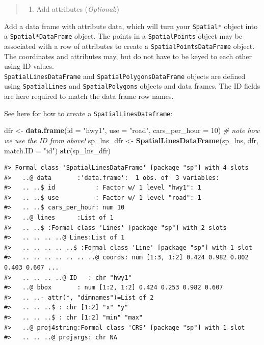 \documentclass[]{book}
\newenvironment{Shaded}{\begin{snugshade}}{\end{snugshade}}
\newcommand{\KeywordTok}[1]{\textcolor[rgb]{0.13,0.29,0.53}{\textbf{#1}}}
\newcommand{\DataTypeTok}[1]{\textcolor[rgb]{0.13,0.29,0.53}{#1}}
\newcommand{\DecValTok}[1]{\textcolor[rgb]{0.00,0.00,0.81}{#1}}
\newcommand{\StringTok}[1]{\textcolor[rgb]{0.31,0.60,0.02}{#1}}
\newcommand{\CommentTok}[1]{\textcolor[rgb]{0.56,0.35,0.01}{\textit{#1}}}
\newcommand{\NormalTok}[1]{#1}
\providecommand{\tightlist}{%
  \setlength{\itemsep}{0pt}\setlength{\parskip}{0pt}}
\theoremstyle{definition}
\theoremstyle{definition}
\theoremstyle{definition}
\theoremstyle{remark}
\begin{document}
\begin{quote}
\begin{enumerate}
\def\labelenumi{\Roman{enumi}.}
\setcounter{enumi}{2}
\tightlist
\item
  Add attributes (\emph{Optional}:)
\end{enumerate}
\end{quote}

Add a data frame with attribute data, which will turn your
\texttt{Spatial*} object into a \texttt{Spatial*DataFrame} object. The
points in a \texttt{SpatialPoints} object may be associated with a row
of attributes to create a \texttt{SpatialPointsDataFrame} object. The
coordinates and attributes may, but do not have to be keyed to each
other using ID values.\\
\texttt{SpatialLinesDataFrame} and \texttt{SpatialPolygonsDataFrame}
objects are defined using \texttt{SpatialLines} and
\texttt{SpatialPolygons} objects and data frames. The ID fields are here
required to match the data frame row names.

See here for how to create a \texttt{SpatialLinesDataframe}:

\begin{Shaded}
\begin{Highlighting}[]
\NormalTok{dfr <-}\StringTok{ }\KeywordTok{data.frame}\NormalTok{(}\DataTypeTok{id =} \StringTok{"hwy1"}\NormalTok{, }\DataTypeTok{use =} \StringTok{"road"}\NormalTok{, }\DataTypeTok{cars_per_hour =} \DecValTok{10}\NormalTok{) }\CommentTok{# note how we use the ID from above!}
\NormalTok{sp_lns_dfr <-}\StringTok{ }\KeywordTok{SpatialLinesDataFrame}\NormalTok{(sp_lns, dfr, }\DataTypeTok{match.ID =} \StringTok{"id"}\NormalTok{)}
\KeywordTok{str}\NormalTok{(sp_lns_dfr)}
\end{Highlighting}
\end{Shaded}

\begin{verbatim}
#> Formal class 'SpatialLinesDataFrame' [package "sp"] with 4 slots
#>   ..@ data       :'data.frame':  1 obs. of  3 variables:
#>   .. ..$ id           : Factor w/ 1 level "hwy1": 1
#>   .. ..$ use          : Factor w/ 1 level "road": 1
#>   .. ..$ cars_per_hour: num 10
#>   ..@ lines      :List of 1
#>   .. ..$ :Formal class 'Lines' [package "sp"] with 2 slots
#>   .. .. .. ..@ Lines:List of 1
#>   .. .. .. .. ..$ :Formal class 'Line' [package "sp"] with 1 slot
#>   .. .. .. .. .. .. ..@ coords: num [1:3, 1:2] 0.424 0.982 0.802 0.403 0.607 ...
#>   .. .. .. ..@ ID   : chr "hwy1"
#>   ..@ bbox       : num [1:2, 1:2] 0.424 0.253 0.982 0.607
#>   .. ..- attr(*, "dimnames")=List of 2
#>   .. .. ..$ : chr [1:2] "x" "y"
#>   .. .. ..$ : chr [1:2] "min" "max"
#>   ..@ proj4string:Formal class 'CRS' [package "sp"] with 1 slot
#>   .. .. ..@ projargs: chr NA
\end{verbatim}
\end{document}
